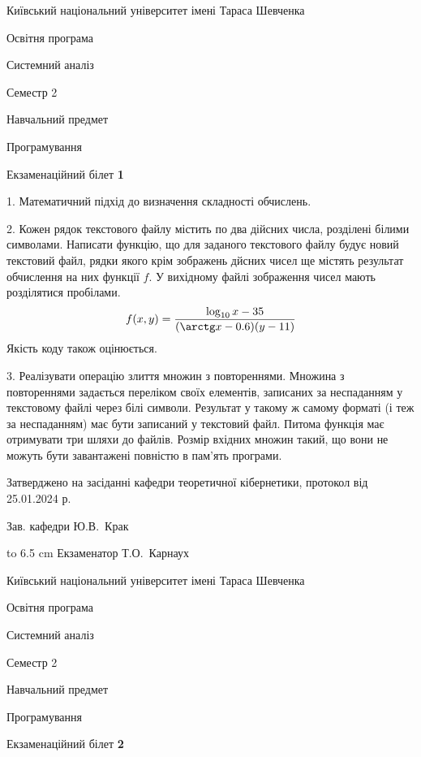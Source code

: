 \documentclass[12pt, ukrainian]{article}
\begin{document}
{{\begin {scriptsize}\par
{ \center  Київський національний університет імені Тараса Шевченка \par}
{\parbox {5 cm}{Освітня програма \hfill}{\parbox {7 cm}{Системний аналіз\hfill}}\parbox {6 cm}{\hfill Семестр 2}}\par
{\parbox {5 cm} {Навчальний предмет \hfill}\parbox {7 cm}{Програмування \hfill}\parbox {6cm}{\hfill}\par}\vspace{-15pt} \end{scriptsize}}{\center Екзаменаційний білет \No \textbf { 1 }\par}}
{%
1. Математичний підхід до визначення складності обчислень.%
\par
\vspace{2mm}

2. Кожен рядок текстового файлу містить по два дійсних числа, розділені білими символами.
Написати функцію, що для заданого текстового файлу будує новий текстовий файл, рядки якого крім зображень дйсних чисел ще містять результат обчислення на них функції $f$. У вихідному файлі зображення чисел мають розділятися пробілами. 
$$f(x, y) =\frac{\log_{10} x - 35}{(\arctg x - 0.6) (y - 11)}$$ 
Якість коду також оцінюється.

\par
\vspace{2mm}

3. Реалізувати операцію злиття множин з повтореннями. Множина з повтореннями задається переліком своїх елементів, записаних за неспаданням у текстовому файлі через білі символи. Результат у такому ж самому форматі (і теж за неспаданням) має бути записаний у текстовий файл. Питома функція має отримувати три шляхи до файлів. Розмір вхідних множин такий, що вони не можуть бути завантажені повністю в пам’ять програми.

}
{\smallskip\smallskip \begin {scriptsize} Затверджено на засіданні кафедри теоретичної кібернетики, протокол   від   25.01.2024 р.\par\smallskip\smallskip\smallskip\smallskip
{\parbox {6.5 cm} {Зав. кафедри \dotfill Ю.В.~Крак}}\hspace {0.7cm} {\hbox to 6.5 cm { Екзаменатор \dotfill Т.О.~Карнаух}} \end{scriptsize}}
\vspace{0.9cm}
{{\begin {scriptsize}\par
{ \center  Київський національний університет імені Тараса Шевченка \par}
{\parbox {5 cm}{Освітня програма \hfill}{\parbox {7 cm}{Системний аналіз\hfill}}\parbox {6 cm}{\hfill Семестр 2}}\par
{\parbox {5 cm} {Навчальний предмет \hfill}\parbox {7 cm}{Програмування \hfill}\parbox {6cm}{\hfill}\par}\vspace{-15pt} \end{scriptsize}}{\center Екзаменаційний білет \No \textbf { 2 }\par}}
\end{document}
